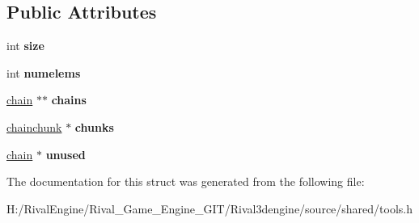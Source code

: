 \subsection*{Public Attributes}
\begin{DoxyCompactItemize}
\item 
\mbox{\label{structhashbase_a600b191339f6da94d03bd9d69bcd9baf}} 
int {\bfseries size}
\item 
\mbox{\label{structhashbase_a330deb84e27f14c22f27d870f3686c56}} 
int {\bfseries numelems}
\item 
\mbox{\label{structhashbase_a94b490f872197369d1cdf618a5bcaf95}} 
\hyperlink{structhashbase_1_1chain}{chain} $\ast$$\ast$ {\bfseries chains}
\item 
\mbox{\label{structhashbase_a558356b897ae6305cdf9365fcdd76d1b}} 
\hyperlink{structhashbase_1_1chainchunk}{chainchunk} $\ast$ {\bfseries chunks}
\item 
\mbox{\label{structhashbase_a2e6fb865c933c90e21b4b0ec504d7a63}} 
\hyperlink{structhashbase_1_1chain}{chain} $\ast$ {\bfseries unused}
\end{DoxyCompactItemize}


The documentation for this struct was generated from the following file\+:\begin{DoxyCompactItemize}
\item 
H\+:/\+Rival\+Engine/\+Rival\+\_\+\+Game\+\_\+\+Engine\+\_\+\+G\+I\+T/\+Rival3dengine/source/shared/tools.\+h\end{DoxyCompactItemize}
